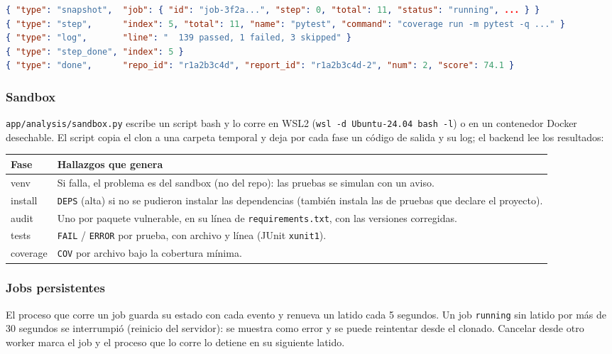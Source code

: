 \documentclass[11pt,a4paper]{article}
\newcommand{\code}[1]{\texttt{\small #1}}
\newcommand{\ruta}[1]{\texttt{\small\color{branddark}#1}}
\begin{document}
\begin{lstlisting}[language=JSON]
{ "type": "snapshot",  "job": { "id": "job-3f2a...", "step": 0, "total": 11, "status": "running", ... } }
{ "type": "step",      "index": 5, "total": 11, "name": "pytest", "command": "coverage run -m pytest -q ..." }
{ "type": "log",       "line": "  139 passed, 1 failed, 3 skipped" }
{ "type": "step_done", "index": 5 }
{ "type": "done",      "repo_id": "r1a2b3c4d", "report_id": "r1a2b3c4d-2", "num": 2, "score": 74.1 }
\end{lstlisting}

\subsubsection*{Sandbox}

\ruta{app/analysis/sandbox.py} escribe un script bash y lo corre en WSL2 (\code{wsl -d Ubuntu-24.04 bash -l}) o en un
contenedor Docker desechable. El script copia el clon a una carpeta temporal y deja por cada fase un código de salida y
su log; el backend lee los resultados:

\begin{center}
\small
\begin{tabularx}{\linewidth}{@{}lL@{}}
\toprule
\textbf{Fase} & \textbf{Hallazgos que genera} \\
\midrule
venv & Si falla, el problema es del sandbox (no del repo): las pruebas se simulan con un aviso. \\
install & \code{DEPS} (alta) si no se pudieron instalar las dependencias (también instala las de pruebas que declare el proyecto). \\
audit & Uno por paquete vulnerable, en su línea de \code{requirements.txt}, con las versiones corregidas. \\
tests & \code{FAIL} / \code{ERROR} por prueba, con archivo y línea (JUnit \code{xunit1}). \\
coverage & \code{COV} por archivo bajo la cobertura mínima. \\
\bottomrule
\end{tabularx}
\end{center}

\subsubsection*{Jobs persistentes}

El proceso que corre un job guarda su estado con cada evento y renueva un latido cada 5 segundos. Un job
\code{running} sin latido por más de 30 segundos se interrumpió (reinicio del servidor): se muestra como error y se
puede reintentar desde el clonado. Cancelar desde otro worker marca el job y el proceso que lo corre lo detiene en su
siguiente latido.
\end{document}
